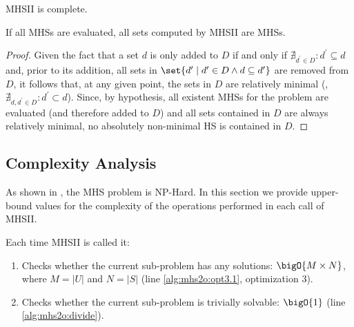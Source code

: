 \begin{corollary}
  \ac{MHSII} is complete.
\end{corollary}

\begin{theorem}[Soundness]
  If all \acp{MHS} are evaluated, all sets computed by \ac{MHSII} are \acp{MHS}.
\end{theorem}

\begin{proof}
  Given the fact that a set $d$ is only added to $D$ if and only if
  $\nexists_{d^\prime\in D}: d^\prime\subseteq d$ and, prior to its
  addition, all sets in $\set{d^\prime \mid d^\prime \in D \wedge d
    \subseteq d^\prime}$ are removed from $D$, it follows that, at any
  given point, the sets in $D$ are relatively minimal (\ie,
  $\nexists_{d,d^\prime\in D}: d^\prime\subset d$).
  Since, by hypothesis, all existent \acp{MHS} for the problem are
  evaluated (and therefore added to $D$) and all sets contained in $D$
  are always relatively minimal, no absolutely non-minimal \ac{HS} is
  contained in $D$.
\end{proof}

\subsection{Complexity Analysis}
\label{sec:mhs2o:analysis:complexity}
As shown in \citep{Garey90}, the \ac{MHS} problem is NP-Hard.
%
In this section we provide upper-bound values for the complexity of
the operations performed in each call of \ac{MHSII}.

Each time \ac{MHSII} is called it:
\begin{enumerate}
\item Checks whether the current sub-problem has any solutions:
  $\bigO{M\times N}$, where $M = |U|$ and $N = |S|$ (line
  \ref{alg:mhs2o:opt3.1}, optimization 3).
\item Checks whether the current sub-problem is trivially solvable:
  $\bigO{1}$ (line \ref{alg:mhs2o:divide}).
\end{enumerate}

